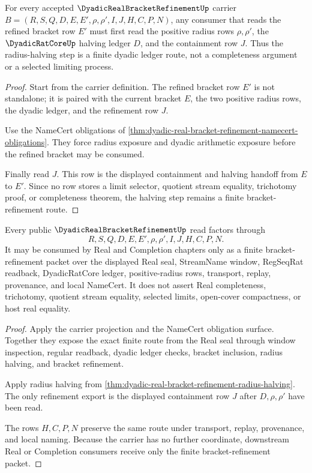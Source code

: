\begin{theorem}
\label{thm:dyadic-real-bracket-refinement-radius-halving}
For every accepted $\DyadicRealBracketRefinementUp$ carrier $B=(R,S,Q,D,E,E',\rho,\rho',I,J,H,C,P,N)$, any consumer that reads the refined bracket row $E'$ must first read the positive radius rows $\rho,\rho'$, the $\DyadicRatCoreUp$ halving ledger $D$, and the containment row $J$. Thus the radius-halving step is a finite dyadic ledger route, not a completeness argument or a selected limiting process.
\end{theorem}
\begin{proof}
Start from the carrier definition. The refined bracket row $E'$ is not standalone; it is paired with the current bracket $E$, the two positive radius rows, the dyadic ledger, and the refinement row $J$.

Use the NameCert obligations of \autoref{thm:dyadic-real-bracket-refinement-namecert-obligations}. They force radius exposure and dyadic arithmetic exposure before the refined bracket may be consumed.

Finally read $J$. This row is the displayed containment and halving handoff from $E$ to $E'$. Since no row stores a limit selector, quotient stream equality, trichotomy proof, or completeness theorem, the halving step remains a finite bracket-refinement route.
\end{proof}

\begin{theorem}
\label{thm:dyadic-real-bracket-refinement-scope}
Every public $\DyadicRealBracketRefinementUp$ read factors through
$$
R,S,Q,D,E,E',\rho,\rho',I,J,H,C,P,N.
$$
It may be consumed by Real and Completion chapters only as a finite bracket-refinement packet over the displayed Real seal, StreamName window, RegSeqRat readback, DyadicRatCore ledger, positive-radius rows, transport, replay, provenance, and local NameCert. It does not assert Real completeness, trichotomy, quotient stream equality, selected limits, open-cover compactness, or host real equality.
\end{theorem}
\begin{proof}
Apply the carrier projection and the NameCert obligation surface. Together they expose the exact finite route from the Real seal through window inspection, regular readback, dyadic ledger checks, bracket inclusion, radius halving, and bracket refinement.

Apply radius halving from \autoref{thm:dyadic-real-bracket-refinement-radius-halving}. The only refinement export is the displayed containment row $J$ after $D,\rho,\rho'$ have been read.

The rows $H,C,P,N$ preserve the same route under transport, replay, provenance, and local naming. Because the carrier has no further coordinate, downstream Real or Completion consumers receive only the finite bracket-refinement packet.
\end{proof}

